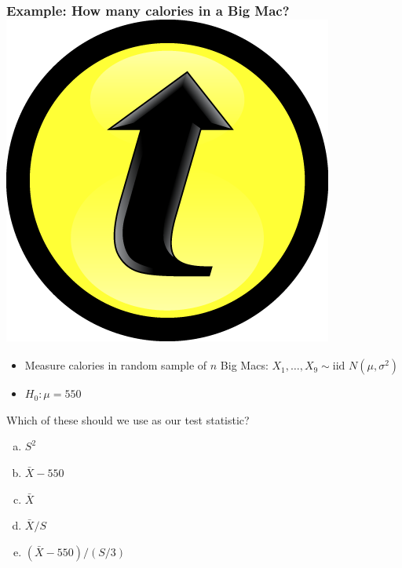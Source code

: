 \documentclass[handout]{beamer}
\begin{document}
\begin{frame}[t]
	\frametitle{Example: How many calories in a Big Mac? \hfill \includegraphics[scale = 0.05]{./images/clicker}}
\begin{itemize}
	\item Measure calories in random sample of $n$ Big Macs: $X_1, \hdots, X_9 \sim \mbox{iid } N(\mu, \sigma^2)$
	\item $H_0\colon \mu = 550$
\end{itemize}

\vspace{1em}

\alert{Which of these should we use as our test statistic?}
\begin{enumerate}[(a)]
	\item $S^2$
	\item $\bar{X} - 550$
	\item $\bar{X}$
	\item $\bar{X} / S$ 
	\item $(\bar{X} - 550)/(S/3)$
\end{enumerate}
\end{frame}
\end{document}
